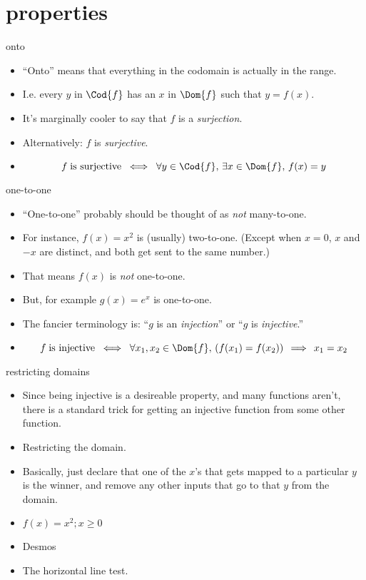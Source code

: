\documentclass[handout,landscape]{beamer}
\begin{document}
\section{properties}

\begin{frame}{onto}
\begin{itemize}
\item ``Onto'' means that everything in the codomain is actually in the range.\pause
\item I.e. every $y$ in $\Cod{f}$ has an $x$ in $\Dom{f}$ such that $y=f(x)$.
\item It's marginally cooler to say that $f$ is a {\em surjection}. \pause
\item Alternatively: $f$ is {\em surjective}. \pause
\item 
\[ f \; \mbox{is surjective} \; \iff \; \forall y \in \Cod{f}, \, \exists x \in \Dom{f}, \, f(x) = y \]
\end{itemize}
\end{frame}

\begin{frame}{one-to-one}
\begin{itemize}
\item ``One-to-one'' probably should be thought of as {\em not} many-to-one. \pause
\item For instance, $f(x) = x^2$ is (usually) two-to-one. \pause \newline
(Except when $x=0$, $x$ and $-x$ are distinct, and both get sent to the same number.)\pause
\item That means $f(x)$ is {\em not} one-to-one. \pause
\item But, for example $g(x) = e^x$ is one-to-one.
\item The fancier terminology is: ``$g$ is an {\em injection}'' or ``$g$ is {\em injective}.'' \pause
\item 
\[ f \; \mbox{is injective} \; \iff \; \forall x_1, x_2 \in \Dom{f}, \, (f(x_1) = f(x_2))\, \implies \, x_1 = x_2 \]
\end{itemize}
\end{frame}

\begin{frame}{restricting domains}
\begin{itemize}
\item Since being injective is a desireable property, and many functions aren't, there is a standard trick for getting an injective function from some other function.\pause
\item Restricting the domain.\pause
\item Basically, just declare that one of the $x$'s that gets mapped to a particular $y$ is the winner, and remove any other inputs that go to that $y$ from the domain. \pause
\item $f(x) = x^2; x \geq 0$ \pause
\item Desmos
\item The horizontal line test.
\end{itemize}
\end{frame}
\end{document}
